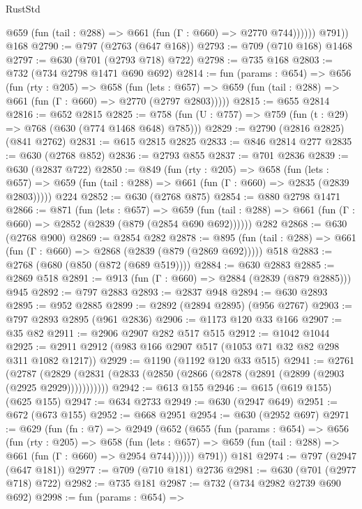 \begin{lexlean}{RustStd}
\begin{coremodule}
              @659 (fun (tail : @288) => @661 (fun (Γ : @660) => @2770 @744))))))
        @791))
    @168
@2790 := @797 (@2763 (@647 @168))
@2793 := @709 (@710 @168) @1468
@2797 := @630 (@701 (@2793 @718) @722)
@2798 := @735 @168
@2803 := @732 (@734 @2798 @1471 @690 @692)
@2814 := fun (params : @654) =>
  @656
    (fun (rty : @205) =>
    @658
      (fun (lets : @657) =>
      @659 (fun (tail : @288) => @661 (fun (Γ : @660) => @2770 (@2797 @2803)))))
@2815 := @655 @2814
@2816 := @652 @2815
@2825 := @758 (fun (U : @757) => @759 (fun (t : @29) => @768 (@630 (@774 @1468 @648) @785)))
@2829 := @2790 (@2816 @2825) (@841 @2762)
@2831 := @615 @2815 @2825
@2833 := @846 @2814 @277
@2835 := @630 (@2768 @852)
@2836 := @2793 @855
@2837 := @701 @2836
@2839 := @630 (@2837 @722)
@2850 := @849
    (fun (rty : @205) =>
    @658
      (fun (lets : @657) =>
      @659 (fun (tail : @288) => @661 (fun (Γ : @660) => @2835 (@2839 @2803)))))
    @224
@2852 := @630 (@2768 @875)
@2854 := @880 @2798 @1471
@2866 := @871
    (fun (lets : @657) =>
    @659 (fun (tail : @288) => @661 (fun (Γ : @660) => @2852 (@2839 (@879 (@2854 @690 @692))))))
    @282
@2868 := @630 (@2768 @900)
@2869 := @2854 @282
@2878 := @895 (fun (tail : @288) => @661 (fun (Γ : @660) => @2868 (@2839 (@879 (@2869 @692))))) @518
@2883 := @2768 (@680 (@850 (@872 (@689 @519))))
@2884 := @630 @2883
@2885 := @2869 @518
@2891 := @913 (fun (Γ : @660) => @2884 (@2839 (@879 @2885))) @945
@2892 := @797 @2883
@2893 := @2837 @948
@2894 := @630 @2893
@2895 := @952 @2885
@2899 := @2892 (@2894 @2895) (@956 @2767)
@2903 := @797 @2893 @2895 (@961 @2836)
@2906 := @1173 @120 @33 @166
@2907 := @35 @82
@2911 := @2906 @2907 @282 @517 @515
@2912 := @1042 @1044
@2925 := @2911 @2912 (@983 @166 @2907 @517 (@1053 @71 @32 @82 @298 @311 @1082 @1217))
@2929 := @1190 (@1192 @120 @33 @515)
@2941 := @2761
    (@2787 (@2829 (@2831 (@2833 (@2850 (@2866 (@2878 (@2891 (@2899 (@2903 (@2925 @2929)))))))))))
@2942 := @613 @155
@2946 := @615 (@619 @155) (@625 @155)
@2947 := @634 @2733
@2949 := @630 (@2947 @649)
@2951 := @672 (@673 @155)
@2952 := @668 @2951
@2954 := @630 (@2952 @697)
@2971 := @629
    (fun (fn : @7) =>
    @2949
      (@652
        (@655
          (fun (params : @654) =>
          @656
            (fun (rty : @205) =>
            @658
              (fun (lets : @657) =>
              @659 (fun (tail : @288) => @661 (fun (Γ : @660) => @2954 @744))))))
        @791))
    @181
@2974 := @797 (@2947 (@647 @181))
@2977 := @709 (@710 @181) @2736
@2981 := @630 (@701 (@2977 @718) @722)
@2982 := @735 @181
@2987 := @732 (@734 @2982 @2739 @690 @692)
@2998 := fun (params : @654) =>

\end{coremodule}
\end{lexlean}
